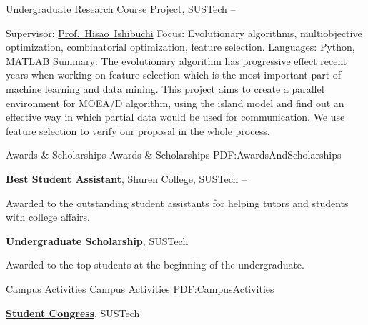 \documentclass[a4paper,MMMyyyy,nonstopmode]{simpleresumecv}
\begin{document}
\begin{Body}
    \Gap
    \BulletItem
    Undergraduate Research Course Project, SUSTech
    \hfill
     --
    \begin{Detail}
        \SubBulletItem
        Supervisor:
        \href{http://cse.sustech.edu.cn/faculty/~hisao/}{Prof.~Hisao~Ishibuchi}
        \SubBulletItem
        Focus:
        Evolutionary algorithms, multiobjective optimization, combinatorial optimization, feature selection.
        \SubBulletItem
        Languages: Python, MATLAB
        \SubBulletItem
        Summary:
        The evolutionary algorithm has progressive effect recent years when working on feature selection which is the most important part of machine learning and data mining. This project aims to create a parallel environment for MOEA/D algorithm, using the island model and find out an effective way in which partial data would be used for communication. We use feature selection to verify our proposal in the whole process.
    \end{Detail}



    \Section
    {Awards \&\newline
        Scholarships}
    {Awards \& Scholarships}
    {PDF:AwardsAndScholarships}

    \BulletItem
    \textbf{Best Student Assistant},
    Shuren College,
    SUSTech
    \hfill
     --
    \begin{Detail}
        \Item
        Awarded to the outstanding student assistants for helping tutors and students with college affairs.
    \end{Detail}

    \Gap
    \BulletItem
    \textbf{Undergraduate Scholarship},
    SUSTech
    \hfill
    \begin{Detail}
        \Item
        Awarded to the top students at the beginning of the undergraduate.
    \end{Detail}




    \Section
    {Campus Activities}
    {Campus Activities}
    {PDF:CampusActivities}

    \Entry
    \href{https://www.sustech.edu.cn/en/campus-life.html?lang=en}
    {\textbf{Student Congress}},
    SUSTech


\end{Body}
\end{document}
